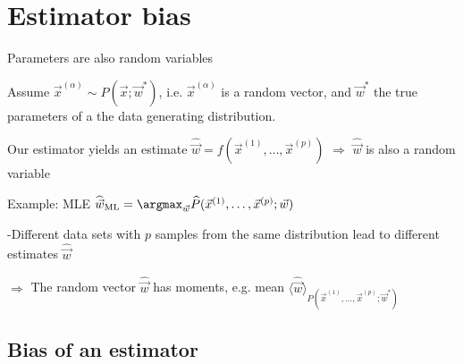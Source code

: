 \section{Estimator bias}


\begin{frame}{Parameters are also random variables}

Assume $\vec x^{(\alpha)} \sim P(\vec x; \vec w^*)$, i.e. $\vec x^{(\alpha)}$ is a random vector, and $\vec w^*$ the true parameters of a the data generating distribution.\\

\svspace{3mm}

Our estimator yields an estimate $\widehat{\vec w} = f(\vec x^{(1)}, \ldots,\vec x^{(p)})$ $\Rightarrow$ $\widehat{\vec w}$ is also a random variable\\

\svspace{3mm}

Example: MLE $\widehat{\vec w}_{\text{ML}} = \argmax_{\vec w} \widehat P(\vec x^{(1)}, \ldots,\vec x^{(p)}; \vec w)$\\

\pause 


\pause

-Different data sets with $p$ samples from the same distribution lead to different estimates $\widehat{\vec w}$

\pause

\svspace{3mm}

$\Rightarrow$ The random vector $\widehat{\vec w}$ has moments, e.g. mean $\langle \widehat{\vec w} \rangle_{P(\vec x^{(1)}, \ldots,\vec x^{(p)}; \vec w^*)}$

\end{frame}

\subsection{Bias of an estimator}

